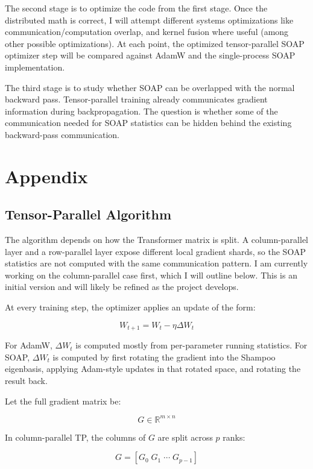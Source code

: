 \documentclass[10pt]{article}
\begin{document}
The second stage is to optimize the code from the first stage. Once the distributed math is correct, I will attempt different systems optimizations like communication/computation overlap, and kernel fusion where useful (among other possible optimizations). At each point, the optimized tensor-parallel SOAP optimizer step will be compared against AdamW and the single-process SOAP implementation.

The third stage is to study whether SOAP can be overlapped with the normal backward pass. Tensor-parallel training already communicates gradient information during backpropagation. The question is whether some of the communication needed for SOAP statistics can be hidden behind the existing backward-pass communication. 





\newpage

\section*{Appendix}
\subsection*{Tensor-Parallel Algorithm}

The algorithm depends on how the Transformer matrix is split. A column-parallel layer and a row-parallel layer expose different local gradient shards, so the SOAP statistics are not computed with the same communication pattern. I am currently working on the column-parallel case first, which I will outline below. This is an initial version and will likely be refined as the project develops.

At every training step, the optimizer applies an update of the form:

$$
W_{t+1} = W_t - \eta \Delta W_t
$$

For AdamW, $\Delta W_t$ is computed mostly from per-parameter running statistics. For SOAP, $\Delta W_t$ is computed by first rotating the gradient into the Shampoo eigenbasis, applying Adam-style updates in that rotated space, and rotating the result back.

Let the full gradient matrix be:

$$
G \in \mathbb{R}^{m \times n}
$$

In column-parallel TP, the columns of $G$ are split across $p$ ranks:

$$
G = [G_0 \; G_1 \; \cdots \; G_{p-1}]
$$
\end{document}
